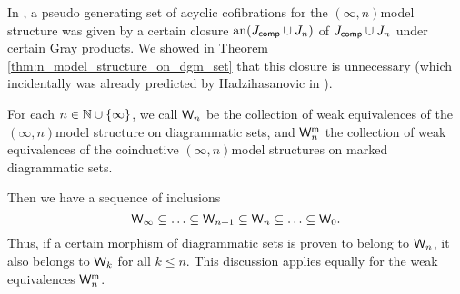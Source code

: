\begin{comm}
    In \cite{chanavat2024model}, a pseudo generating set of acyclic cofibrations for the \( (\infty, n) \)\nbd model structure was given by a certain closure \( \mathrm{an}(J_{\mathsf{comp}} \cup J_{n}) \) of \( J_{\mathsf{comp}} \cup J_{n} \) under certain Gray products.
    We showed in Theorem \ref{thm:n_model_structure_on_dgm_set} that this closure is unnecessary (which incidentally was already predicted by Hadzihasanovic in \cite[Remark 6.9]{hadzihasanovic2020diagrammatic}).
\end{comm}

\begin{dfn}
    For each \( n \in \mathbb{N} \cup \left\{ {\infty} \right\} \), we call \( \mathsf{W}_n \) be the collection of weak equivalences of the \( (\infty, n) \)\nbd model structure on diagrammatic sets, and \( \mathsf{W}^{{\mathsf{m}}}_n \) the collection of weak equivalences of the coinductive \( (\infty, n) \)\nbd model structures on marked diagrammatic sets.
\end{dfn}
\begin{rmk}

    Then we have a sequence of inclusions
    \begin{equation*}
        \mathsf{W}_{\infty} \subseteq \ldots \subseteq \mathsf{W}_{n + 1} \subseteq \mathsf{W}_n \subseteq \ldots \subseteq \mathsf{W}_0.
    \end{equation*}
    Thus, if a certain morphism of diagrammatic sets is proven to belong to \( \mathsf{W}_n \), it also belongs to \( \mathsf{W}_k \) for all \( k \le n \).
    This discussion applies equally for the weak equivalences \( \mathsf{W}^{{\mathsf{m}}}_n \).
\end{rmk}

